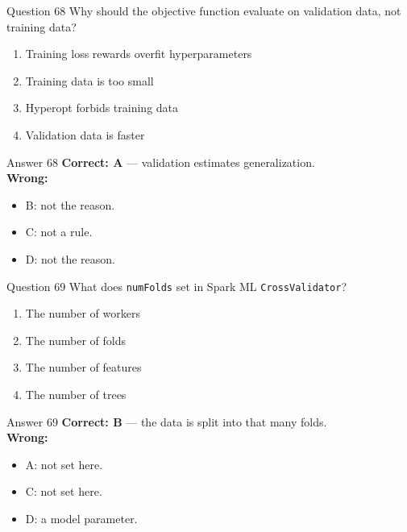 \documentclass[aspectratio=169,11pt]{beamer}
\begin{document}
\begin{frame}{Question 68}
Why should the objective function evaluate on validation data, not training data?
\begin{enumerate}[label=\Alph*.]
\item Training loss rewards overfit hyperparameters
\item Training data is too small
\item Hyperopt forbids training data
\item Validation data is faster
\end{enumerate}
\end{frame}
\begin{frame}{Answer 68}
\textbf{Correct: A} --- validation estimates generalization.\\
\vspace{0.5em}
\textbf{Wrong:}
\begin{itemize}
\item B: not the reason.
\item C: not a rule.
\item D: not the reason.
\end{itemize}
\end{frame}

\begin{frame}{Question 69}
What does \texttt{numFolds} set in Spark ML \texttt{CrossValidator}?
\begin{enumerate}[label=\Alph*.]
\item The number of workers
\item The number of folds
\item The number of features
\item The number of trees
\end{enumerate}
\end{frame}
\begin{frame}{Answer 69}
\textbf{Correct: B} --- the data is split into that many folds.\\
\vspace{0.5em}
\textbf{Wrong:}
\begin{itemize}
\item A: not set here.
\item C: not set here.
\item D: a model parameter.
\end{itemize}
\end{frame}
\end{document}
